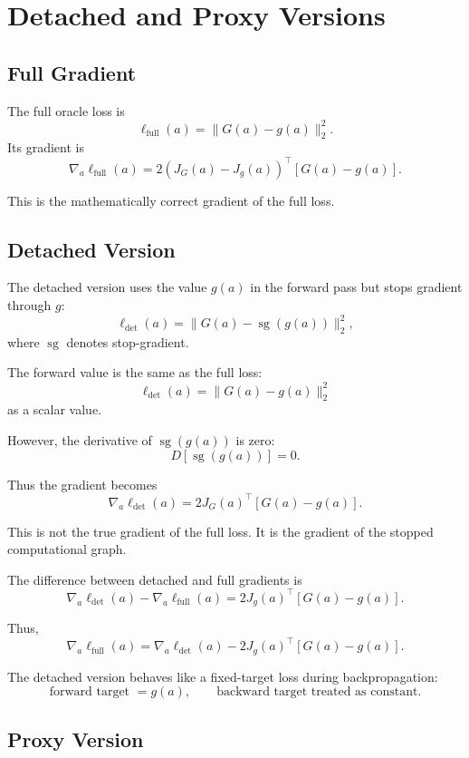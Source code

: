 \documentclass{article}
\begin{document}
\section{Detached and Proxy Versions}

\subsection{Full Gradient}

The full oracle loss is
\[
    \ell_{\mathrm{full}}(a)
    =
    \|G(a)-g(a)\|_2^2.
\]
Its gradient is
\[
    \boxed{
    \nabla_a \ell_{\mathrm{full}}(a)
    =
    2(J_G(a)-J_g(a))^\top [G(a)-g(a)]
    }.
\]

This is the mathematically correct gradient of the full loss.

\subsection{Detached Version}

The detached version uses the value \(g(a)\) in the forward pass but stops gradient through \(g\):
\[
    \ell_{\mathrm{det}}(a)
    =
    \|G(a)-\operatorname{sg}(g(a))\|_2^2,
\]
where \(\operatorname{sg}\) denotes stop-gradient.

The forward value is the same as the full loss:
\[
    \ell_{\mathrm{det}}(a)
    =
    \|G(a)-g(a)\|_2^2
\]
as a scalar value.

However, the derivative of \(\operatorname{sg}(g(a))\) is zero:
\[
    D[\operatorname{sg}(g(a))]=0.
\]

Thus the gradient becomes
\[
    \boxed{
    \nabla_a \ell_{\mathrm{det}}(a)
    =
    2J_G(a)^\top [G(a)-g(a)]
    }.
\]

This is not the true gradient of the full loss. It is the gradient of the stopped computational graph.

The difference between detached and full gradients is
\[
    \nabla_a \ell_{\mathrm{det}}(a)-\nabla_a \ell_{\mathrm{full}}(a)
    =
    2J_g(a)^\top [G(a)-g(a)].
\]

Thus,
\[
    \nabla_a \ell_{\mathrm{full}}(a)
    =
    \nabla_a \ell_{\mathrm{det}}(a)
    -
    2J_g(a)^\top [G(a)-g(a)].
\]

The detached version behaves like a fixed-target loss during backpropagation:
\[
    \text{forward target }=g(a),
    \qquad
    \text{backward target treated as constant}.
\]

\subsection{Proxy Version}
\end{document}
